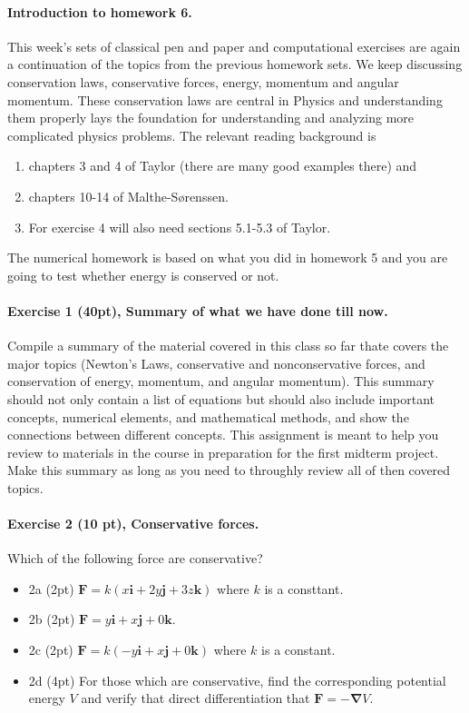 \documentclass[%
oneside,                 %
final,                   %
10pt]{article}
\begin{document}
\noindent
\paragraph{Introduction to homework 6.}
This week's sets of classical pen and paper and computational
exercises are again a continuation of the topics from the previous homework sets. We keep
discussing conservation laws, conservative forces, energy, momentum and angular momentum. These conservation laws are central in Physics and understanding them properly lays the foundation for understanding and analyzing more complicated physics problems.
The relevant reading background is
\begin{enumerate}
\item chapters 3 and 4 of Taylor (there are many good examples there) and

\item chapters 10-14 of Malthe-Sørenssen.

\item For exercise 4 will also need sections 5.1-5.3 of Taylor.
\end{enumerate}

\noindent
The numerical homework is based on what you did in homework 5 and you are going to test whether energy is conserved or not.


\paragraph{Exercise 1 (40pt), Summary of what we have done till now.}
Compile a summary of the material covered in this class so far thate
covers the major topics (Newton’s Laws, conservative and
nonconservative forces, and conservation of energy, momentum, and
angular momentum).  This summary should not only contain a list of
equations but should also include important concepts, numerical
elements, and mathematical methods, and show the connections between
different concepts.  This assignment is meant to help you review to
materials in the course in preparation for the first midterm project.
Make this summary as long as you need to throughly review all of then
covered topics.




\paragraph{Exercise 2 (10 pt), Conservative forces.}
Which of the following force are conservative?
\begin{itemize}
\item 2a (2pt) $\bm{F}=k(x\bm{i}+2y\bm{j}+3z\bm{k})$ where $k$ is a consttant.

\item 2b (2pt) $\bm{F}=y\bm{i}+x\bm{j}+0\bm{k}$.

\item 2c (2pt) $\bm{F}=k(-y\bm{i}+x\bm{j}+0\bm{k})$ where $k$ is a constant.

\item 2d (4pt) For those which are conservative, find the corresponding potential energy $V$ and verify that direct differentiation that $\bm{F}=-\bm{\nabla} V$.
\end{itemize}
\end{document}
